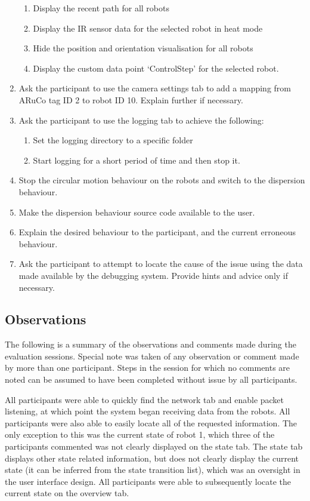 \begin{enumerate}
\begin{enumerate}
  \item Display the recent path for all robots
  \item Display the IR sensor data for the selected robot in heat mode
  \item Hide the position and orientation visualisation for all robots
  \item Display the custom data point `ControlStep' for the selected robot.
 \end{enumerate}
 \item Ask the participant to use the camera settings tab to add a mapping from ARuCo tag ID 2 to robot ID 10. Explain further if necessary.
 \item Ask the participant to use the logging tab to achieve the following:
 \begin{enumerate}
  \item Set the logging directory to a specific folder
  \item Start logging for a short period of time and then stop it.
 \end{enumerate}
 \item Stop the circular motion behaviour on the robots and switch to the dispersion behaviour.
 \item Make the dispersion behaviour source code available to the user.
 \item Explain the desired behaviour to the participant, and the current erroneous behaviour.
 \item Ask the participant to attempt to locate the cause of the issue using the data made available by the debugging system. Provide hints and advice only if necessary.
\end{enumerate}

\subsection{Observations}
The following is a summary of the observations and comments made during the evaluation sessions. Special note was taken of any observation or comment made by more than one participant. Steps in the session for which no comments are noted can be assumed to have been completed without issue by all participants.

All participants were able to quickly find the network tab and enable packet listening, at which point the system began receiving data from the robots. All participants were also able to easily locate all of the requested information. The only exception to this was the current state of robot 1, which three of the participants commented was not clearly displayed on the state tab. The state tab displays other state related information, but does not clearly display the current state (it can be inferred from the state transition list), which was an oversight in the user interface design. All participants were able to subsequently locate the current state on the overview tab.

